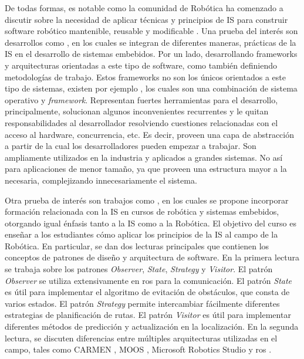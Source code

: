 De todas formas, es notable como la comunidad de Robótica ha comenzado a discutir sobre la necesidad de aplicar técnicas y principios de IS para construir software robótico mantenible, reusable y modificable \cite{Brugali2009, mejoras-2}. Una prueba del interés son desarrollos como \cite{FernandezMadrigal2003, model,model2,model3}, en los cuales se integran de diferentes maneras, prácticas de la \gls{IS} en el desarrollo de sistemas embebidos. Por un lado, desarrollando \glspl{framework} y arquitecturas orientadas a este tipo de software, como también definiendo metodologías de trabajo. Estos \glspl{framework} no son los únicos orientados a este tipo de sistemas, existen por ejemplo \cite{framework-1, framework-ros}, los cuales son una combinación de sistema operativo y \textit{framework}. Representan fuertes herramientas para el desarrollo, principalmente, solucionan algunos inconvenientes recurrentes y le quitan responsabilidades al desarrollador resolviendo cuestiones relacionadas con el acceso al hardware, concurrencia, etc. Es decir, proveen una capa de abstracción a partir de la cual los desarrolladores pueden empezar a trabajar. Son ampliamente utilizados en la industria y aplicados a grandes sistemas. No así para aplicaciones de menor tamaño, ya que proveen una estructura mayor a la necesaria, complejizando innecesariamente el sistema.

Otra prueba de interés son trabajos como \cite{Shin15fase}, en los cuales se propone incorporar formación relacionada con la \gls{IS} en cursos de robótica y sistemas embebidos, otorgando igual énfasis tanto a la \gls{IS} como a la Robótica. El objetivo del curso es enseñar a los estudiantes cómo aplicar los principios de la \gls{IS} al campo de la Robótica. En particular, se dan dos lecturas principales que contienen los conceptos de patrones de diseño y arquitectura de software. En la primera lectura se trabaja sobre los patrones \textit{Observer}, \textit{State}, \textit{Strategy} y \textit{Visitor}. El patrón \textit{Observer} se utiliza extensivamente en \gls{ros} \cite{framework-ros} para la comunicación. El patrón \textit{State} es útil para implementar el algoritmo de evitación de obstáculos, que consta de varios estados. El patrón \textit{Strategy} permite intercambiar fácilmente diferentes estrategias de planificación de rutas. El patrón \textit{Visitor} es útil para implementar diferentes métodos de predicción y actualización en la localización. En la segunda lectura, se discuten diferencias entre múltiples arquitecturas utilizadas en el campo, tales como CARMEN \cite{carmen}, MOOS \cite{moos}, Microsoft Robotics Studio \cite{microsoft} y \gls{ros} \cite{framework-ros}. 

